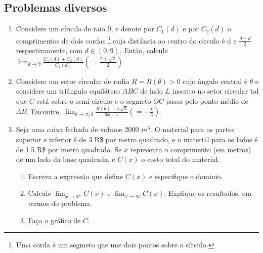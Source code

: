 \documentclass[latin,20pt]{article}
\begin{document}
     \subsection{Problemas diversos}   
      \begin{enumerate}
      \item Considere um círculo de raio $9$, e denote por $C_{1}(d)$
      e por $C_{2}(d)$ o comprimentos de dois cordas \footnote{ Uma corda é um segmeto que une dois pontos sobre o círculo.} cuja distância ao centro do circulo é d e $\frac{9+d}{2}$ respectivamente, com $d \in (0,9)$. Então, calcule $\lim_{d \rightarrow 9} \frac{C_{1}(d)+C_{2}(d)}{C_{1}(d)}
      (=\frac{2+\sqrt{2}}{2})$ 
      \item Considere um setor circular de radio $R=R(\theta)>0$ cujo ângulo central é $\theta$ e
      considere um triângulo equilátero $ABC$ de lado $L$ inscrito no setor circular tal que $C$ está sobre o semi-circulo e o segmeto $OC$ passa pelo ponto médio de $AB$. Encontre,   
      $\lim_{\theta \rightarrow \pi/3} \frac{R(\theta)-L\sqrt{3}}{3x-\pi}
      (=-\frac{L}{3})$. 
      \item Seja uma caixa fechada de volume 2000 $m^{3}$. O material para as partes superior e inferior é de 3 R\$ por metro quadrado, e o material para os lados é de 1.5 R\$ por metro quadrado. Se $x$ representa o comprimento (em metros) de um lado da base quadrada, e $C(x)$ o costo total do material. 
        \begin{enumerate}
        \item Escreva a expressão que define $C(x)$ e especifique o dominio. 
        \item Calcule $\lim_{x \rightarrow 0^{+}} C(x)$ e 
        $\lim_{x \rightarrow \infty} C(x)$. Explique os resultados, em termos do problema. 
        \item Faça o gráfico de $C$. 
        \end{enumerate}
      \end{enumerate}
\end{document}
